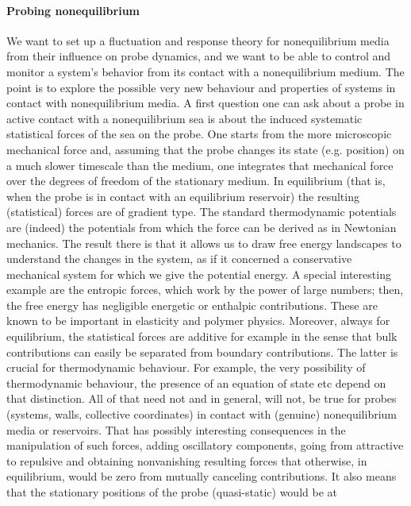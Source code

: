 \paragraph{Probing nonequilibrium}

We want to set up a fluctuation and response theory for nonequilibrium media
from their influence on probe dynamics, and we want to be able to control and monitor a
system’s behavior from its contact with a nonequilibrium medium. The point is to explore the
possible very new behaviour and properties of systems in contact with nonequilibrium
media. A first question one can ask about a probe in active contact with a nonequilibrium
sea is about the induced systematic statistical forces of the sea on the probe.  One starts
from the more microscopic mechanical force and, assuming that the probe changes its state
(e.g. position) on a much slower timescale than the medium, one integrates that mechanical
force over the degrees of freedom of the stationary medium.  In equilibrium (that is, when
the probe is in contact with an equilibrium reservoir) the resulting (statistical) forces
are of gradient type.  The standard thermodynamic potentials are (indeed) the potentials
from which the force can be derived as in Newtonian mechanics. The result there is that it
allows us to draw free energy landscapes to understand the changes in the system, as if it
concerned a conservative mechanical system for which we give the potential energy.  A
special interesting example are the entropic forces, which work by the power of large
numbers; then, the free energy has negligible energetic or enthalpic contributions.  These
are known to be important in elasticity and polymer physics. Moreover, always for
equilibrium, the statistical forces are additive for example in the sense that bulk
contributions can easily be separated from boundary contributions.  The latter is crucial
for thermodynamic behaviour.  For example, the very possibility of thermodynamic behaviour,
the presence of an equation of state etc depend on that distinction.  All of that need not
and in general, will not,
be true for probes (systems, walls, collective coordinates) in contact with (genuine)
nonequilibrium media or reservoirs. That has possibly
interesting consequences in the manipulation of such forces, adding oscillatory components,
going from attractive to repulsive and obtaining nonvanishing resulting forces that
otherwise, in equilibrium, would be zero from mutually canceling contributions.
%
It also means that the stationary positions of the probe (quasi-static) would be at

